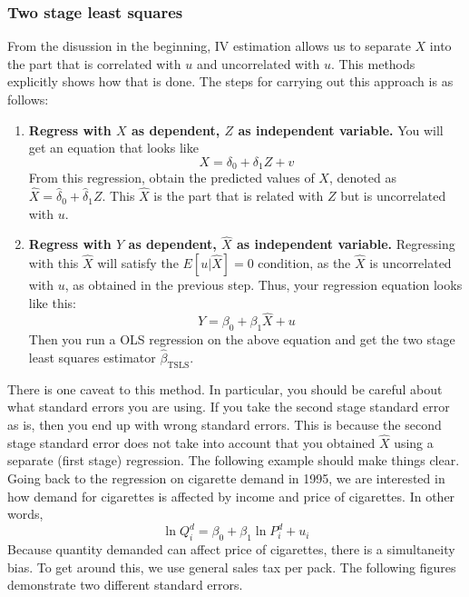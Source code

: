 \documentclass[12pt]{article}
\theoremstyle{definition}
\theoremstyle{property}
\theoremstyle{assumption}
\theoremstyle{example}
\theoremstyle{comment}
\begin{document}
\subsubsection{Two stage least squares} %
From the disussion in the beginning, IV estimation allows us to separate $X$ into the part that is correlated with $u$ and uncorrelated with $u$. This methods explicitly shows how that is done. The steps for carrying out this approach is as follows:
\begin{enumerate}
\item \textbf{Regress with $X$ as dependent, $Z$ as independent variable.} You will get an equation that looks like
\[
X=\delta_0 + \delta_1Z+v
\]
From this regression, obtain the predicted values of $X$, denoted as $\hat{X}=\hat{\delta}_0+\hat{\delta}_1Z$. This $\hat{X}$ is the part that is related with $Z$ but is uncorrelated with $u$.
\item \textbf{Regress with $Y$ as dependent, $\hat{X}$ as independent variable.} Regressing with this $\hat{X}$ will satisfy the $E[u|\hat{X}]=0$ condition, as the $\hat{X}$ is uncorrelated with $u$, as obtained in the previous step. Thus, your regression equation looks like this:
\[
Y=\beta_0+\beta_1\hat{X}+u
\]
Then you run a OLS regression on the above equation and get the two stage least squares estimator $\hat{\beta}_{\text{TSLS}}$. 
\end{enumerate} \par\medskip
There is one caveat to this method. In particular, you should be careful about what standard errors you are using. If you take the second stage standard error as is, then you end up with wrong standard errors. This is because the second stage standard error does not take into account that you obtained $\hat{X}$ using a separate (first stage) regression. The following example should make things clear. Going back to the regression on cigarette demand in 1995, we are interested in how demand for cigarettes is affected by income and price of cigarettes. In other words,
\[
\ln{Q_i^d}=\beta_0+\beta_1\ln{P_i^d}+u_i
\]
Because quantity demanded can affect price of cigarettes, there is a simultaneity bias. To get around this, we use general sales tax per pack. The following figures demonstrate two different standard errors.
\end{document}
